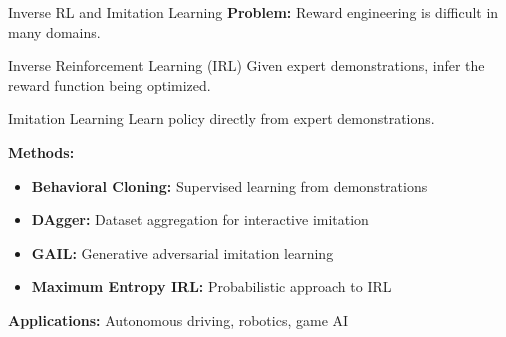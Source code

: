 \documentclass[aspectratio=169]{beamer}
\begin{document}
\begin{frame}{Inverse RL and Imitation Learning}
  \textbf{Problem:} Reward engineering is difficult in many domains.

  \vspace{0.5em}

  \begin{definitionbox}{Inverse Reinforcement Learning (IRL)}
    Given expert demonstrations, infer the reward function being optimized.
  \end{definitionbox}

  \vspace{0.5em}

  \begin{definitionbox}{Imitation Learning}
    Learn policy directly from expert demonstrations.
  \end{definitionbox}

  \vspace{0.5em}

  \textbf{Methods:}
  \begin{itemize}
    \item \textbf{Behavioral Cloning:} Supervised learning from demonstrations
    \item \textbf{DAgger:} Dataset aggregation for interactive imitation
    \item \textbf{GAIL:} Generative adversarial imitation learning
    \item \textbf{Maximum Entropy IRL:} Probabilistic approach to IRL
  \end{itemize}

  \vspace{0.5em}

  \textbf{Applications:} Autonomous driving, robotics, game AI
\end{frame}
\end{document}
